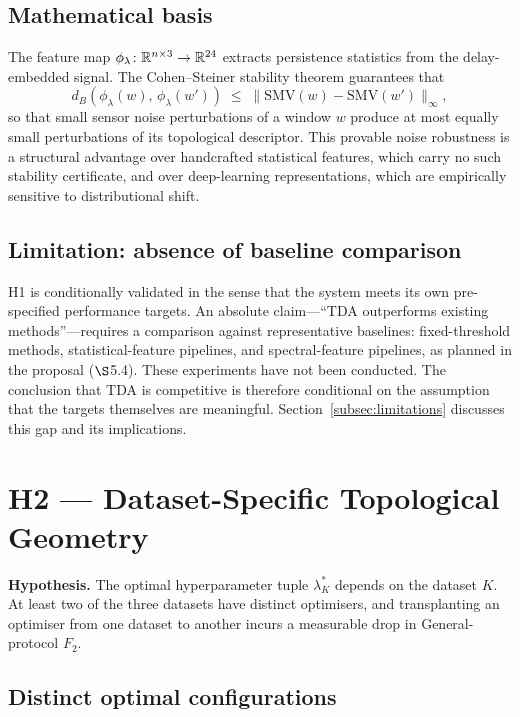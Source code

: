 \subsection{Mathematical basis}

The feature map $\phi_\lambda\colon\mathbb{R}^{n\times 3}\to\mathbb{R}^{24}$ extracts persistence
statistics from the delay-embedded signal.  The Cohen--Steiner stability theorem
guarantees that
\[
  d_B(\phi_\lambda(w),\,\phi_\lambda(w'))\;\leq\;\|\mathrm{SMV}(w)-\mathrm{SMV}(w')\|_\infty,
\]
so that small sensor noise perturbations of a window $w$ produce at most equally
small perturbations of its topological descriptor.  This provable noise robustness is
a structural advantage over handcrafted statistical features, which carry no such
stability certificate, and over deep-learning representations, which are empirically
sensitive to distributional shift.

\subsection{Limitation: absence of baseline comparison}

H1 is conditionally validated in the sense that the system meets its own pre-specified
performance targets.  An absolute claim---``TDA outperforms existing methods''---requires
a comparison against representative baselines: fixed-threshold methods, statistical-feature
pipelines, and spectral-feature pipelines, as planned in the proposal ($\S$5.4).  These
experiments have not been conducted.  The conclusion that TDA is competitive is therefore
conditional on the assumption that the targets themselves are meaningful.  Section~\ref{subsec:limitations}
discusses this gap and its implications.

\section{H2 — Dataset-Specific Topological Geometry}
\label{subsec:H2}

\textbf{Hypothesis.}  The optimal hyperparameter tuple $\lambda^*_K$ depends on the
dataset $K$.  At least two of the three datasets have distinct optimisers, and
transplanting an optimiser from one dataset to another incurs a measurable drop in
General-protocol $F_2$.

\subsection{Distinct optimal configurations}

